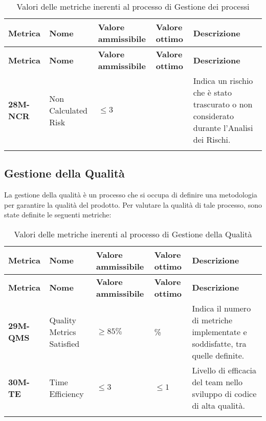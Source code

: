 \begin{longtable}{|>{\centering\arraybackslash}p{}|>{\centering\arraybackslash}p{}|>{\centering\arraybackslash}p{}|>{\centering\arraybackslash}p{}|>{\centering\arraybackslash}p{}|}
	\hline
	\textbf{Metrica} & \textbf{Nome}       & \textbf{Valore ammissibile} & \textbf{Valore ottimo} & \textbf{Descrizione}                                                                     \\
	\hline
	\endfirsthead
	\hline
	\textbf{Metrica} & \textbf{Nome}       & \textbf{Valore ammissibile} & \textbf{Valore ottimo} & \textbf{Descrizione}                                                                     \\
	\endhead
	\textbf{28M-NCR} & Non Calculated Risk & $\leq 3 $                   & 0                      & Indica un rischio che è stato trascurato o non considerato durante l’Analisi dei Rischi. \\
	\hline
	\hline
	\caption{ Valori delle metriche inerenti al processo di Gestione dei processi}
	\label{table:9}
\end{longtable}

\subsection{Gestione della Qualità}
La gestione della qualità è un processo che si occupa di definire una metodologia per garantire la qualità del prodotto.
Per valutare la qualità di tale processo, sono state definite le seguenti metriche:

\begin{longtable}{|>{\centering\arraybackslash}p{}|>{\centering\arraybackslash}p{}|>{\centering\arraybackslash}p{}|>{\centering\arraybackslash}p{}|>{\centering\arraybackslash}p{}|}
	\hline
	\textbf{Metrica} & \textbf{Nome}             & \textbf{Valore ammissibile} & \textbf{Valore ottimo} & \textbf{Descrizione}                                                          \\
	\hline
	\endfirsthead
	\hline
	\textbf{Metrica} & \textbf{Nome}             & \textbf{Valore ammissibile} & \textbf{Valore ottimo} & \textbf{Descrizione}                                                          \\
	\endhead
	\textbf{29M-QMS} & Quality Metrics Satisfied & $\geq 85\% $                & 100\%                  & Indica il numero di metriche implementate e soddisfatte, tra quelle definite. \\
	\hline
	\textbf{30M-TE}  & Time Efficiency           & $\leq 3 $                   & $\leq 1 $              & Livello di efficacia del team nello sviluppo di codice di alta qualità.       \\
	\hline
	\caption{ Valori delle metriche inerenti al processo di Gestione della Qualità}
	\label{table:10}
\end{longtable}


